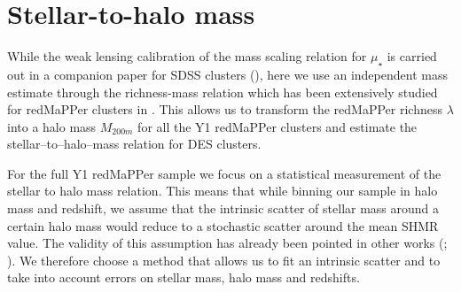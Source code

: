 {\section{Stellar-to-halo mass}\label{shmrsec}
While the weak lensing calibration of the mass scaling relation for $\mu_\star$ is carried out in a companion paper for SDSS clusters (\citealt{maria}), here we use an independent mass estimate through the richness-mass relation which has been extensively studied for redMaPPer clusters in \citet{melchior}. This allows us to transform the redMaPPer richness $\lambda$ into a halo mass $M_{200m}$ for all the Y1 redMaPPer clusters and estimate the stellar--to--halo--mass relation for DES clusters. 

For the full Y1 redMaPPer sample we focus on a statistical measurement of the stellar to halo mass relation. This means that while binning our sample in halo mass and redshift, we assume that the intrinsic scatter of stellar mass around a certain halo mass would reduce to a stochastic scatter around the mean SHMR value. The validity of this assumption has already been pointed in other works (\citealt{zu}; \citealt{guo}). We therefore choose a method that allows us to fit an intrinsic scatter and to take into account errors on stellar mass, halo mass and redshifts.

}
